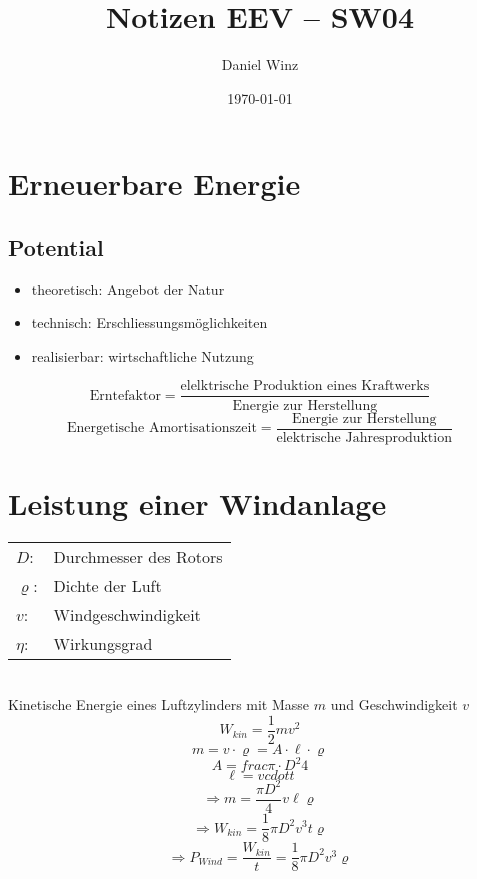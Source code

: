 \documentclass[a4,paper,fleqn]{article}
\title{Notizen EEV -- SW04}
\date{\today}
\author{Daniel Winz}
\begin{document}
\maketitle
\clearpage

\section{Erneuerbare Energie}

\subsection{Potential}
\begin{itemize}
    \item theoretisch: Angebot der Natur
    \item technisch: Erschliessungsmöglichkeiten
    \item realisierbar: wirtschaftliche Nutzung
\end{itemize}

\[ \text{Erntefaktor} = 
    \frac{\text{elelktrische Produktion eines Kraftwerks}}
         {\text{Energie zur Herstellung}} \]
\[ \text{Energetische Amortisationszeit} = 
    \frac{\text{Energie zur Herstellung}}
         {\text{elektrische Jahresproduktion}} \]

\section{Leistung einer Windanlage}
\begin{tabular}{@{}ll}
    $D$:        & Durchmesser des Rotors \\
    $\varrho$:  & Dichte der Luft \\
    $v$:        & Windgeschwindigkeit \\
    $\eta$:     & Wirkungsgrad \\
\end{tabular}
\\
Kinetische Energie eines Luftzylinders mit Masse $m$ und Geschwindigkeit $v$
\[ W_{kin} = \frac{1}{2} m v^2 \]
\[ m = v \cdot \varrho = A \cdot \ell \cdot \varrho \]
\[ A = frac{\pi \cdot D^2}{4} \]
\[ \ell = v cdot t \]
\[ \Rightarrow m = \frac{\pi D^2}{4} v \ell \varrho \]
\[ \Rightarrow W_{kin} = \frac{1}{8} \pi D^2 v^3 t \varrho \]
\[ \Rightarrow P_{Wind} = \frac{W_{kin}}{t} = \frac{1}{8} \pi D^2 v^3 \varrho \]
\end{document}
